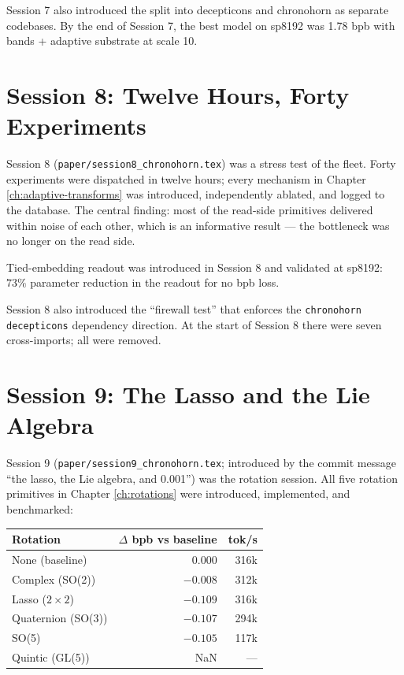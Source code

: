 \documentclass[11pt,openany]{book}
\theoremstyle{definition}
\theoremstyle{plain}
\begin{document}
Session 7 also introduced the split into decepticons and chronohorn as
separate codebases. By the end of Session 7, the best model on sp8192 was
1.78 bpb with bands + adaptive substrate at scale 10.

\chapter{Session 8: Twelve Hours, Forty Experiments}
\label{ch:session8}

Session 8 (\texttt{paper/session8\_chronohorn.tex}) was a stress test of
the fleet. Forty experiments were dispatched in twelve hours; every
mechanism in Chapter \ref{ch:adaptive-transforms} was introduced,
independently ablated, and logged to the database. The central finding:
most of the read-side primitives delivered within noise of each other,
which is an informative result --- the bottleneck was no longer on the
read side.

Tied-embedding readout was introduced in Session 8 and validated at sp8192:
$73\%$ parameter reduction in the readout for no bpb loss.

Session 8 also introduced the ``firewall test'' that enforces the
\texttt{chronohorn \not\to decepticons} dependency direction. At the
start of Session 8 there were seven cross-imports; all were removed.

\chapter{Session 9: The Lasso and the Lie Algebra}
\label{ch:session9}

Session 9 (\texttt{paper/session9\_chronohorn.tex}; introduced by the
commit message ``the lasso, the Lie algebra, and 0.001'') was the rotation
session. All five rotation primitives in Chapter \ref{ch:rotations} were
introduced, implemented, and benchmarked:
\begin{center}
\begin{tabular}{lrr}
\toprule
Rotation & $\Delta$ bpb vs baseline & tok/s \\
\midrule
None (baseline)       &  0.000 & 316k \\
Complex (SO(2))       & $-0.008$ & 312k \\
Lasso ($2\times 2$)   & $\mathbf{-0.109}$ & 316k \\
Quaternion (SO(3))    & $-0.107$ & 294k \\
SO(5)                 & $-0.105$ & 117k \\
Quintic (GL(5))       & NaN & --- \\
\bottomrule
\end{tabular}
\end{center}
\end{document}
